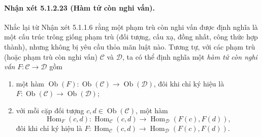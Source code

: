 \paragraph{Nhận xét 5.1.2.23 (Hàm tử còn nghi vấn).} Nhắc lại từ Nhận xét 5.1.1.6 rằng một phạm trù còn nghi vấn được định nghĩa là một cấu trúc trông giống phạm trù (đối tượng, cấu xạ, đồng nhất, công thức hợp thành), nhưng không bị yêu cầu thỏa mãn luật nào. Tương tự, với các phạm trù (hoặc phạm trù còn nghi vấn) $\mathcal C$ và $\mathcal D$, ta có thể định nghĩa một \emph{hàm tử còn nghi vấn} $F:\mathcal C\to\mathcal D$ gồm
\begin{enumerate}[label=\Alph*.]
\item một hàm $\operatorname{Ob}(F):\operatorname{Ob}(\mathcal C)\to\operatorname{Ob}(\mathcal D)$, đôi khi chỉ ký hiệu là $F:\operatorname{Ob}(\mathcal C)\to\operatorname{Ob}(\mathcal D)$;
\item với mỗi cặp đối tượng $c,d\in\operatorname{Ob}(\mathcal C)$, một hàm
\[\operatorname{Hom}_F(c,d):\operatorname{Hom}_{\mathcal C}(c,d)\longrightarrow\operatorname{Hom}_{\mathcal D}(F(c),F(d)),\]
đôi khi chỉ ký hiệu là $F:\operatorname{Hom}_{\mathcal C}(c,d)\to\operatorname{Hom}_{\mathcal D}(F(c),F(d))$.
\end{enumerate}
